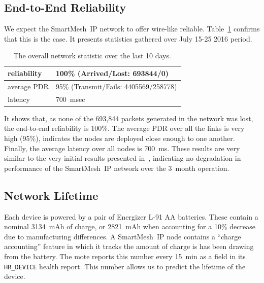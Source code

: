 \documentclass{sig-alternate}
\newcommand{\smip}                {SmartMesh~IP\xspace}
\newcommand{\HRDEVICE}            {{\tt HR\_DEVICE}\xspace}
\begin{document}
\subsection{End-to-End Reliability}
\label{sec:net_reliability}


We expect the \smip network to offer wire-like reliable.
Table~\ref{tab:net_stats} confirms that this is the case.
It presents statistics gathered over July 15-25 2016 period.

\begin{table}
    \begin{tabular}{|l|l|}
        \hline
        reliability & 100\% (Arrived/Lost:   693844/0)\\ \hline
        average PDR & 95\% (Transmit/Fails: 4405569/258778)\\ \hline
        latency     & 700~msec\\
        \hline
    \end{tabular}
    \caption{The overall network statistic over the last 10 days.}
    \label{tab:net_stats}
\end{table}

It shows that, as none of the 693,844 packets generated in the network was lost, the end-to-end reliability is 100\%.
The average PDR over all the links is very high (95\%), indicates the nodes are deployed close enough to one another.
Finally, the average latency over all nodes is 700~ms.
These results are very similar to the very initial results presented in~\cite{watteyne16peach}, indicating no degradation in performance of the \smip network over the 3~month operation.

\subsection{Network Lifetime}
\label{sec:lifetime}


Each device is powered by a pair of Energizer L-91 AA batteries.
These contain a nominal 3134~mAh of charge, or 2821~mAh when accounting for a 10\% decrease due to manufacturing differences.
A \smip node contains a ``charge accounting'' feature in which it tracks the amount of charge is has been drawing from the battery.
The mote reports this number every 15~min as a field in its \HRDEVICE health report.
This number allows us to predict the lifetime of the device.
\end{document}
